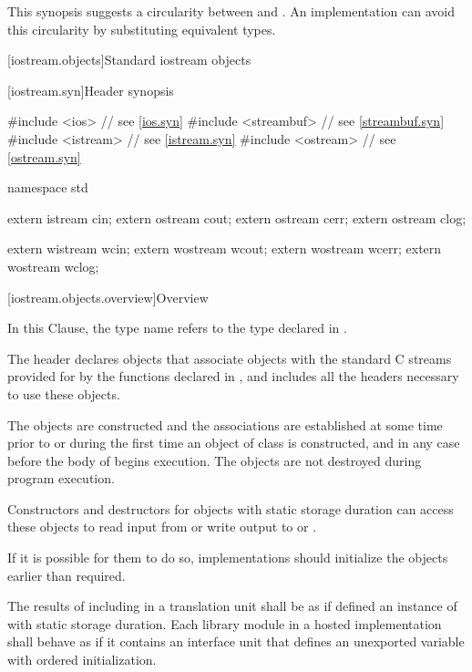 \pnum
\begin{note}
This synopsis suggests a circularity between
and
.
An implementation can avoid this circularity by substituting equivalent
types.
\end{note}

[iostream.objects]{Standard iostream objects}

[iostream.syn]{Header  synopsis}

%
\begin{codeblock}
#include <ios>          // see \ref{ios.syn}
#include <streambuf>    // see \ref{streambuf.syn}
#include <istream>      // see \ref{istream.syn}
#include <ostream>      // see \ref{ostream.syn}

namespace std {
  extern istream cin;
  extern ostream cout;
  extern ostream cerr;
  extern ostream clog;

  extern wistream wcin;
  extern wostream wcout;
  extern wostream wcerr;
  extern wostream wclog;
}
\end{codeblock}

[iostream.objects.overview]{Overview}

\pnum
In this Clause, the type name  refers to
the type  declared in .

\pnum
The header 
declares objects that associate objects with the
standard C streams provided for by the functions declared in
, and includes all the headers necessary to use these objects.

\pnum
The objects are constructed and the associations are established at some
time prior to or during the first time an object of class
 is constructed, and in any case before the body
of  begins execution.
The objects are not destroyed during program execution.
\begin{footnote}
Constructors and destructors for objects with
static storage duration can
access these objects to read input from
or write output to
or
.
\end{footnote}

\pnum
\recommended
If it is possible for them to do so, implementations should
initialize the objects earlier than required.

\pnum
The results of including  in a translation unit shall be as if
 defined an instance of  with static
storage duration.
Each \Cpp{} library module in a hosted implementation
shall behave as if it contains an interface unit that
defines an unexported  variable with
ordered initialization.

